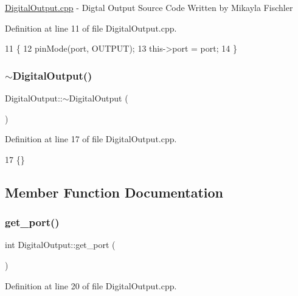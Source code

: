 \hyperlink{_digital_output_8cpp}{Digital\+Output.\+cpp} -\/ Digtal Output Source Code Written by Mikayla Fischler 

Definition at line 11 of file Digital\+Output.\+cpp.


\begin{DoxyCode}
11                                      \{
12     pinMode(port, OUTPUT);
13     this->port = port;
14 \}
\end{DoxyCode}
\mbox{\label{class_digital_output_a442e379ebfbd2939d568809dad9c0ba2}} 
\subsubsection{\texorpdfstring{$\sim$\+Digital\+Output()}{~DigitalOutput()}}
{\footnotesize\ttfamily Digital\+Output\+::$\sim$\+Digital\+Output (\begin{DoxyParamCaption}{ }\end{DoxyParamCaption})}



Definition at line 17 of file Digital\+Output.\+cpp.


\begin{DoxyCode}
17 \{\}
\end{DoxyCode}


\subsection{Member Function Documentation}
\mbox{\label{class_digital_output_a6b05ec0083899a814df78b376e1ab8cd}} 
\subsubsection{\texorpdfstring{get\+\_\+port()}{get\_port()}}
{\footnotesize\ttfamily int Digital\+Output\+::get\+\_\+port (\begin{DoxyParamCaption}{ }\end{DoxyParamCaption})}



Definition at line 20 of file Digital\+Output.\+cpp.


